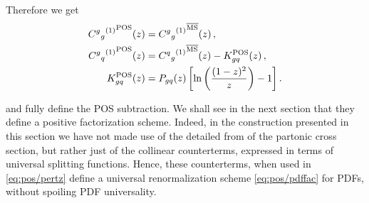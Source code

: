 Therefore we get
\begin{align}\label{eq:pos/counthgg}
 {{C^g{}_g}^{(1)}}^{\textrm{POS}}(z) &=  {{C^g{}_g}^{(1)}}^{{\overline{\textrm{MS}}}}(z) \,, \\
 {{C^g{}_q}^{(1)}}^{\textrm{POS}}(z) &=  {{C^q{}_g}^{(1)}}^{{\overline{\textrm{MS}}}}(z) - K_{gq}^{\textrm{POS}} (z) \,,\\ \label{eq:pos/counthgq}
  K_{gq}^{\textrm{POS}} (z) &=  P_{gq}(z)\left[\ln\left(\frac{(1-z)^2}{z}\right)
    - 1\right].
\end{align}

 and
 fully define the POS subtraction.
We shall see in the next section that they define a positive factorization
scheme.
Indeed, in the construction presented in this section we have not made use of
the detailed from of the partonic cross section, but rather just of the
collinear counterterms, expressed in terms of universal splitting functions.
Hence, these counterterms, when used in \cref{eq:pos/pertz}  define a universal
renormalization scheme \cref{eq:pos/pdffac} for PDFs, without spoiling PDF
universality.


